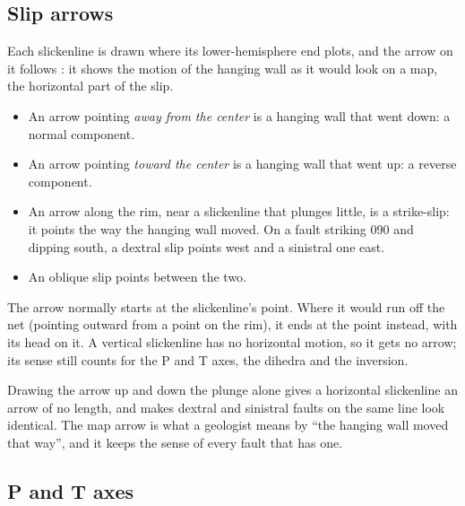 
\subsection{Slip arrows}\label{sec:slip-arrows}

Each slickenline is drawn where its lower-hemisphere end plots, and the arrow on it follows
: it shows the motion of the hanging wall as it
would look on a map, the horizontal part of the slip.

\begin{itemize}
\item An arrow pointing \emph{away from the center} is a hanging wall that went down: a normal component.
\item An arrow pointing \emph{toward the center} is a hanging wall that went up: a reverse component.
\item An arrow along the rim, near a slickenline that plunges little, is a strike-slip: it points the way
the hanging wall moved. On a fault striking 090 and dipping south, a dextral slip points west and a
sinistral one east.
\item An oblique slip points between the two.
\end{itemize}

The arrow normally starts at the slickenline's point. Where it would run off the net (pointing outward
from a point on the rim), it ends at the point instead, with its head on it. A vertical slickenline has
no horizontal motion, so it gets no arrow; its sense still counts for the P and T axes, the dihedra and
the inversion.

\begin{why}
Drawing the arrow up and down the plunge alone gives a horizontal slickenline an
arrow of no length, and makes dextral and sinistral faults on the same line look identical. The map
arrow is what a geologist means by \enquote{the hanging wall moved that way}, and it keeps the sense of
every fault that has one.
\end{why}

\subsection{P and T axes}

